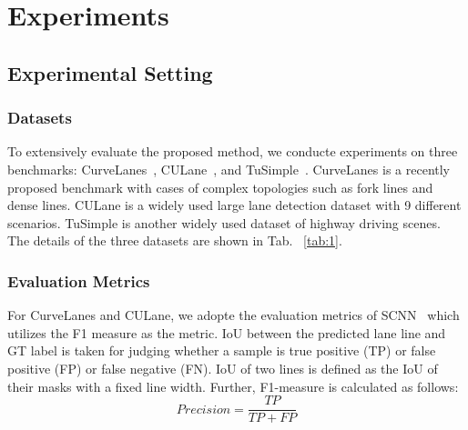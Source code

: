 \documentclass[10pt,twocolumn,letterpaper]{article}
\begin{document}
\section{Experiments}
\subsection{Experimental Setting}
\subsubsection{Datasets}
To extensively evaluate the proposed method, we conducte experiments on three benchmarks: CurveLanes~\cite{li2020curvelane}, CULane~\cite{pan2018spatial}, and TuSimple~\cite{c.elmohamed}. CurveLanes is a recently proposed benchmark with cases of complex topologies such as fork lines and dense lines. CULane is a widely used large lane detection dataset with 9 different scenarios. TuSimple is another widely used dataset of highway driving scenes. The details of the three datasets are shown in Tab. ~\ref{tab:1}.
\begin{table}[h]
\begin{center}
\end{center}
\caption{Details of three datasets.}
\label{tab:1}
\end{table}

\subsubsection{Evaluation Metrics}
For CurveLanes and CULane, we adopte the evaluation metrics of SCNN~\cite{pan2018spatial} which utilizes the F1 measure as the metric. IoU between the predicted lane line and GT label is taken for judging whether a sample is true positive (TP) or false positive (FP) or false negative (FN). IoU of two lines is defined as the IoU of their masks with a fixed line width. Further, F1-measure is calculated as follows:
\begin{equation}
    \displaystyle
Precision=\frac{TP}{TP+FP}
\label{pr} 
\end{equation}
\end{document}

